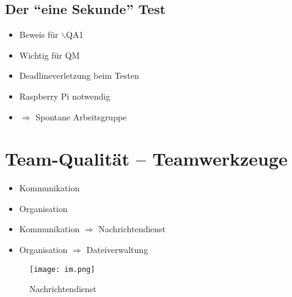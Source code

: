 \documentclass[ignorenonframetext, 11pt, table]{beamer}
\begin{document}
\subsection{Der "`eine Sekunde"' Test}
\begin{frame}
\begin{itemize}
    \item<1-> Beweis für $\backslash$QA1
    \item<2-> Wichtig für QM
    \item<3-> Deadlineverletzung beim Testen
    \item<4-> Raspberry Pi notwendig
    \item<5-> $\Rightarrow$ Spontane Arbeitsgruppe
\end{itemize}
\end{frame}

\section{Team-Qualität -- Teamwerkzeuge}
\begin{frame}
    \begin{itemize}
        \item Kommunikation  
        \item Organisation  
    \end{itemize}
\end{frame}
\begin{frame}
    \begin{itemize}
        \item Kommunikation  $\Rightarrow$ Nachrichtendienst
        \item Organisation  $\Rightarrow$ Dateiverwaltung
    \end{itemize}
\end{frame}

\begin{frame}
\begin{figure}
\centering
\texttt{[image: im.png]}
\caption{Nachrichtendienst}
\end{figure}
\end{frame}
\end{document}
